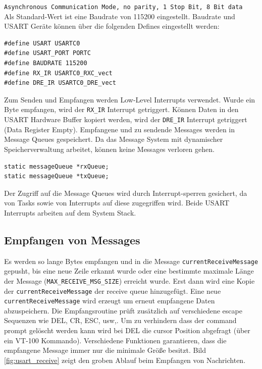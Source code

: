 \documentclass[fontsize=12pt, toc=bibliography, notitlepage]{scrreprt}
\begin{document}
\lstinline$Asynchronous Communication Mode, no parity, 1 Stop Bit, 8 Bit data$\\

Als Standard-Wert ist eine Baudrate von 115200 eingestellt. Baudrate und USART Geräte können über die folgenden Defines eingestellt werden:

\begin{lstlisting}
#define USART USARTC0
#define USART_PORT PORTC
#define BAUDRATE 115200
#define RX_IR USARTC0_RXC_vect
#define DRE_IR USARTC0_DRE_vect
\end{lstlisting}

Zum Senden und Empfangen werden Low-Level Interrupts verwendet. Wurde ein Byte empfangen, wird der \lstinline$RX_IR$ Interrupt getriggert. Können Daten in den USART Hardware Buffer kopiert werden, wird der \lstinline$DRE_IR$ Interrupt getriggert (Data Register Empty). Empfangene und zu sendende Messages werden in Message Queues gespeichert. Da das Message System mit dynamischer Speicherverwaltung arbeitet, können keine Messages verloren gehen.

\begin{lstlisting}
static messageQueue *rxQueue;
static messageQueue *txQueue;
\end{lstlisting}

Der Zugriff auf die Message Queues wird durch Interrupt-sperren gesichert, da von Tasks sowie von Interrupts auf diese zugegriffen wird. Beide USART Interrupts arbeiten auf dem System Stack.

\subsection{Empfangen von Messages}
Es werden so lange Bytes empfangen und in die Message \lstinline$currentReceiveMessage$ gepusht, bis eine neue Zeile erkannt wurde oder eine bestimmte maximale Länge der Message (\lstinline$MAX_RECEIVE_MSG_SIZE$) erreicht wurde. Erst dann wird eine Kopie der \lstinline$currentReceiveMessage$ der receive queue hinzugefügt. Eine neue \lstinline$currentReceiveMessage$ wird erzeugt um erneut empfangene Daten abzuspeichern. Die Empfangsroutine prüft zusätzlich auf verschiedene escape Sequenzen wie DEL, CR, ESC, usw,. Um zu verhindern dass der command prompt gelöscht werden kann wird bei DEL die cursor Position abgefragt (über ein VT-100 Kommando). Verschiedene Funktionen garantieren, dass die empfangene Message immer nur die minimale Größe besitzt. Bild \ref{fig:usart_receive} zeigt den groben Ablauf beim Empfangen von Nachrichten.
\end{document}
